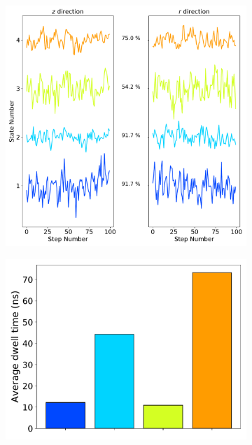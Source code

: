 \documentclass{article}
\begin{document}
  \begin{figure}
  \centering
  \begin{subfigure}{0.6\textwidth}
  \includegraphics[width=\textwidth]{common_states_MET.pdf}
  \caption{}\label{fig:common_states_MET_lines}
  \end{subfigure}
  \begin{subfigure}{0.35\textwidth}
  \includegraphics[width=\textwidth]{dwell_times_MET.pdf}

\end{subfigure}
\end{figure}
\end{document}
